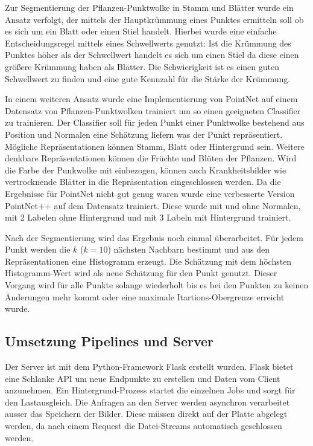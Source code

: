 \documentclass[12pt,titlepage, twoside]{article}
\begin{document}
Zur Segmentierung der Pflanzen-Punktwolke in Stamm und Blätter wurde ein Ansatz verfolgt, der mittels der Hauptkrümmung eines Punktes ermitteln soll ob es sich um ein Blatt oder einen Stiel handelt. 
Hierbei wurde eine einfache Entscheidungsregel mittels eines Schwellwerts genutzt: Ist die Krümmung des Punktes höher als der Schwellwert handelt es sich um einen Stiel da diese einen größere Krümmung haben als Blätter.
Die Schwierigkeit ist es einen guten Schwellwert zu finden und eine gute Kennzahl für die Stärke der Krümmung.

In einem weiteren Ansatz wurde eine Implementierung von PointNet auf einem Datensatz von Pflanzen-Punktwolken trainiert um so einen geeigneten Classifier zu trainieren. 
Der Classifier soll für jeden Punkt einer Punktwolke bestehend aus Position und Normalen eine Schätzung liefern was der Punkt repräsentiert. Mögliche Repräsentationen können Stamm, Blatt oder Hintergrund sein.
Weitere denkbare Repräsentationen können die Früchte und Blüten der Pflanzen. Wird die Farbe der Punkwolke mit einbezogen, können auch Krankheitsbilder wie vertrocknende Blätter in die Repräsentation eingeschlossen werden.  
Da die Ergebnisse für PointNet nicht gut genug waren wurde eine verbesserte Version PointNet++ auf dem Datensatz trainiert. Diese wurde mit und ohne Normalen, mit 2 Labelen ohne Hintergrund und mit 3 Labeln mit Hintergrund trainiert.

Nach der Segmentierung wird das Ergebnis noch einmal überarbeitet. Für jedem Punkt werden die $k$ ($k=10$) nächsten Nachbarn bestimmt und aus den Repräsentationen eine Histogramm erzeugt. 
Die Schätzung mit dem höchsten Histogramm-Wert wird als neue Schätzung für den Punkt genutzt. Dieser Vorgang wird für alle Punkte solange wiederholt bis es bei den Punkten zu keinen Änderungen mehr kommt oder eine maximale Itartions-Obergrenze erreicht wurde.


\subsection{Umsetzung Pipelines und Server}
\label{sec:realisierung:implementierung4}
Der Server ist mit dem Python-Framework Flask erstellt wurden. Flask bietet eine Schlanke API um neue Endpunkte zu erstellen und Daten vom Client anzunehmen. 
Ein Hintergrund-Prozess startet die einzelnen Jobs und sorgt für den Lastausgleich. Die Anfragen an den Server werden asynchron verarbeitet ausser das Speichern der Bilder. 
Diese müssen direkt auf der Platte abgelegt werden, da nach einem Request die Datei-Streams automatisch geschlossen werden.
\end{document}
